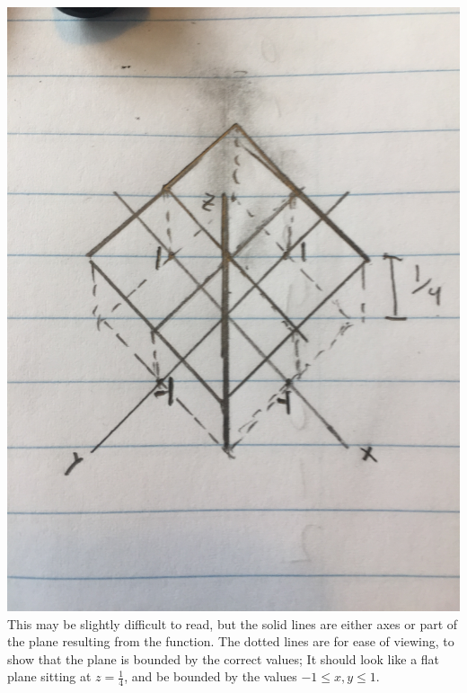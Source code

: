 \includegraphics[width=0.5\linewidth]{2a.jpg}\\
This may be slightly difficult to read, but the solid lines are either axes or part of the plane resulting from the function. The dotted lines are for ease of viewing, to show that the plane is bounded by the correct values; It should look like a flat plane sitting at $z=\frac{1}{4}$, and be bounded by the values $-1 \leq x,y \leq 1$.